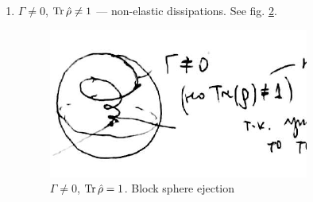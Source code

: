 \begin{enumerate}
\begin{figure}[h!]
		\label{fig:gammanenol1}
	\end{figure}
	\item $\Gamma \neq 0$, $\operatorname{Tr} \hat{\rho} \neq 1$ --- non-elastic dissipations. See fig. \ref{fig:gammanenol}.
	\begin{figure}[h!]
		\centering
		\includegraphics[width=0.6\linewidth]{fig/L5/gamma_ne_nol}
		\caption{$\Gamma \neq 0$, $\operatorname{Tr} \hat{\rho} = 1$. Block sphere ejection}
		\label{fig:gammanenol}
	\end{figure}
\end{enumerate}



